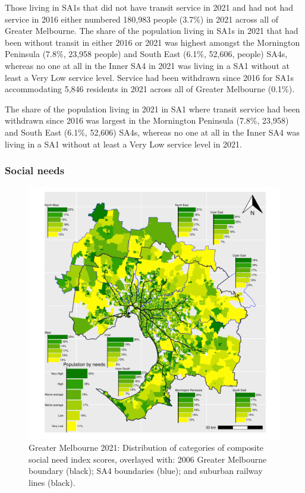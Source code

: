 \documentclass[preprint, 3p,
authoryear]{elsarticle} %
\begin{document}
Those living in SA1s that did not have transit service in 2021 and had
not had service in 2016 either numbered 180,983 people (3.7\%) in 2021
across all of Greater Melbourne. The share of the population living in
SA1s in 2021 that had been without transit in either 2016 or 2021 was
highest amongst the Mornington Peninsula (7.8\%, 23,958 people) and
South East (6.1\%, 52,606, people) SA4s, whereas no one at all in the
Inner SA4 in 2021 was living in a SA1 without at least a Very Low
service level. Service had been withdrawn since 2016 for SA1s
accommodating 5,846 residents in 2021 across all of Greater Melbourne
(0.1\%).

The share of the population living in 2021 in SA1 where transit service
had been withdrawn since 2016 was largest in the Mornington Peninsula
(7.8\%, 23,958) and South East (6.1\%, 52,606) SA4s, whereas no one at
all in the Inner SA4 was living in a SA1 without at least a Very Low
service level in 2021.

\subsubsection{Social needs}\label{social-needs}

\begin{figure}
\centering
\includegraphics{ReynoldsCurrieQu2024_files/figure-latex/Greater_Melbourne_2021_social_needs-1.pdf}
\caption{Greater Melbourne 2021: Distribution of categories of composite
social need index scores, overlayed with: 2006 Greater Melbourne
boundary (black); SA4 boundaries (blue); and suburban railway lines
(black).}
\end{figure}
\end{document}
